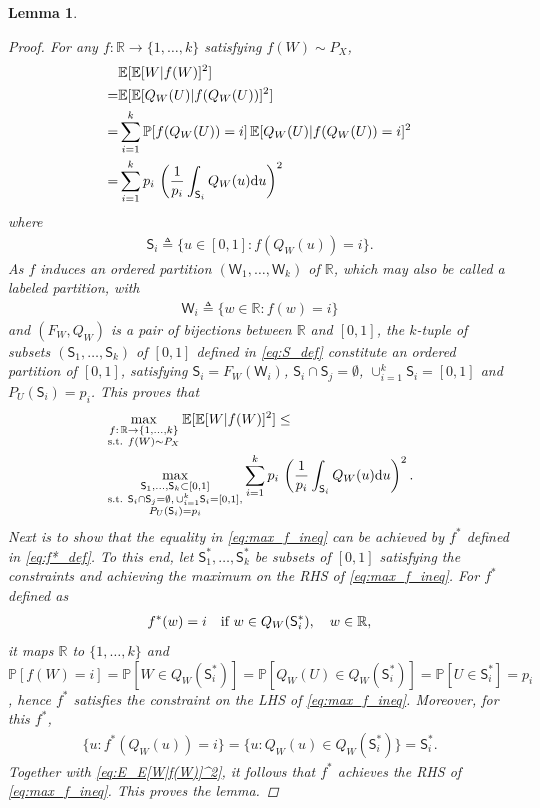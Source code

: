 \documentclass[conference]{IEEEtran}
\newtheorem{lemma}{Lemma}
\newcommand{\R}{\mathbb{R}}
\newcommand{\E}{\mathbb{E}}
\def\sS{{\mathsf S}}
\def\sW{{\mathsf W}}
\def\rd{{\rm d}}
\def\PP{{\mathbb P}}
\def\deq{\triangleq}
\begin{document}
\begin{lemma}
\begin{proof}
For any $f:\R\rightarrow\{1,\ldots,k\}$ satisfying $f(W) \sim P_X$,
\begin{align}
& \E[\E[W|f(W)]^2] \nonumber \\
=& \E[\E[Q_W(U)|f(Q_W(U))]^2]  \\
=& 
\sum_{i=1}^k \PP[f(Q_W(U))=i] \, \E[Q_W(U)|f(Q_W(U))=i]^2 \\
=& 
\sum_{i=1}^k p_i \, \left(\frac{1}{p_i}\int_{\sS_i}Q_W(u) \rd u \right)^2 \label{eq:E_E[W|f(W)]^2}
\end{align}
where
\begin{align}
    \sS_i \deq \{u \in [0,1]: f(Q_W(u))=i\} . \label{eq:S_def}
\end{align}
As $f$ induces an ordered partition $(\sW_1,\ldots,\sW_k)$ of $\R$, which may also be called a labeled partition,
with 
\begin{align}
\sW_i \deq \{w\in\R: f(w)=i\}
\end{align} 
and $(F_W, Q_W)$ is a pair of bijections between $\R$ and $[0,1]$, the $k$-tuple of subsets $(\sS_1,\ldots,\sS_k)$ of $[0,1]$ defined in \eqref{eq:S_def} constitute an ordered partition of $[0,1]$, satisfying
$\sS_i = F_W(\sW_i)$, $\sS_i\cap \sS_j = \emptyset$, $\cup_{i=1}^k \sS_i = [0,1]$ and $P_U(\sS_i)=p_i$.
This proves that
\begin{align}
& \max_{\substack{f:\,\R \rightarrow \{1,\ldots,k\} 
\\ 
\textnormal{s.t. } f(W)\sim P_X}} \E[\E[W|f(W)]^2] 
\le \nonumber \\
& 
\max_{\substack{\sS_1,\ldots,\sS_k\subset[0,1] 
\\
\textnormal{s.t. } \sS_i\cap \sS_j = \emptyset, \, \cup_{i=1}^k \sS_i = [0,1], \\
P_U(\sS_i)=p_i}}
\sum_{i=1}^k p_i \, \left(\frac{1}{p_i}\int_{\sS_i}Q_W(u) \rd u \right)^2 . \label{eq:max_f_ineq}
\end{align}
Next is to show that the equality in \eqref{eq:max_f_ineq} can be achieved by $f^*$ defined in \eqref{eq:f*_def}.
To this end, let $\sS^*_1,\ldots,\sS^*_k$ be subsets of $[0,1]$ satisfying the constraints and achieving the maximum on the RHS of \eqref{eq:max_f_ineq}.
For $f^*$ defined as
\begin{align}
    f^*(w) = i \quad\textnormal{if $w\in Q_W(\sS^*_i)$} , \quad w\in\R , \nonumber
\end{align}
it maps $\R$ to $\{1,\ldots,k\}$ and $\PP[f(W)=i]=\PP[W\in Q_W(\sS^*_i)] = \PP[Q_W(U)\in Q_W(\sS^*_i)] = \PP[U\in\sS^*_i] = p_i$, hence $f^*$ satisfies the constraint on the LHS of \eqref{eq:max_f_ineq}.
Moreover, for this $f^*$,
\begin{align}
   \{u: f^*(Q_W(u))=i\} 
   = \{u: Q_W(u) \in Q_W(\sS^*_i)\} 
  =\sS^*_i .
\end{align}
Together with \eqref{eq:E_E[W|f(W)]^2}, it follows that $f^*$ achieves the RHS of \eqref{eq:max_f_ineq}. This proves the lemma.
\end{proof}

\end{lemma}
\end{document}
